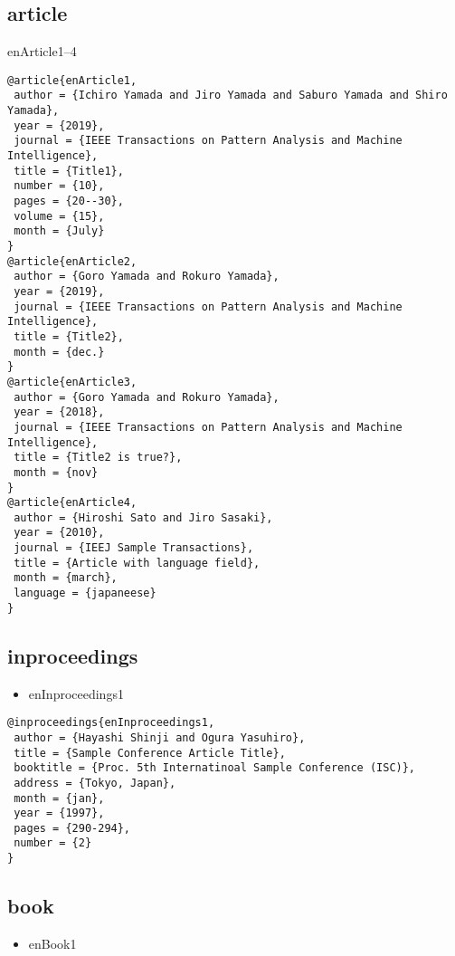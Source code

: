 \documentclass[9pt, twocolumn, a4paper]{jsarticle}
\begin{document}
\begin{bibunit}[IEEJtran]

\subsection{article}

enArticle1--4\cite{enArticle1,enArticle2,enArticle3,enArticle4}

\begin{lstlisting}
@article{enArticle1,
 author = {Ichiro Yamada and Jiro Yamada and Saburo Yamada and Shiro Yamada},
 year = {2019},
 journal = {IEEE Transactions on Pattern Analysis and Machine Intelligence},
 title = {Title1},
 number = {10},
 pages = {20--30},
 volume = {15},
 month = {July}
}
@article{enArticle2,
 author = {Goro Yamada and Rokuro Yamada},
 year = {2019},
 journal = {IEEE Transactions on Pattern Analysis and Machine Intelligence},
 title = {Title2},
 month = {dec.}
}
@article{enArticle3,
 author = {Goro Yamada and Rokuro Yamada},
 year = {2018},
 journal = {IEEE Transactions on Pattern Analysis and Machine Intelligence},
 title = {Title2 is true?},
 month = {nov}
}
@article{enArticle4,
 author = {Hiroshi Sato and Jiro Sasaki},
 year = {2010},
 journal = {IEEJ Sample Transactions},
 title = {Article with language field},
 month = {march},
 language = {japaneese}
}
\end{lstlisting}

\subsection{inproceedings}

\begin{itemize}
  \item enInproceedings1 \cite{enInproceedings1}
\end{itemize}

\begin{lstlisting}
@inproceedings{enInproceedings1,
 author = {Hayashi Shinji and Ogura Yasuhiro},
 title = {Sample Conference Article Title},
 booktitle = {Proc. 5th Internatinoal Sample Conference (ISC)},
 address = {Tokyo, Japan},
 month = {jan},
 year = {1997},
 pages = {290-294},
 number = {2}
}
\end{lstlisting}

\subsection{book}

\begin{itemize}
  \item enBook1 \cite{enBook1}
\end{itemize}


\end{bibunit}
\end{document}
